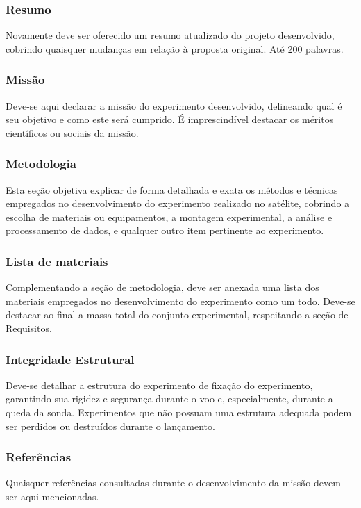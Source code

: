         \subsubsection{Resumo}
            Novamente deve ser oferecido um resumo atualizado do projeto desenvolvido, cobrindo quaisquer mudanças em relação à proposta original. Até 200 palavras.

        \subsubsection{Missão}
            Deve-se aqui declarar a missão do experimento desenvolvido, delineando qual é seu objetivo e como este será cumprido. É imprescindível destacar os méritos científicos ou sociais da missão.
        
        \subsubsection{Metodologia}
            Esta seção objetiva explicar de forma detalhada e exata os métodos e técnicas empregados no desenvolvimento do experimento realizado no satélite, cobrindo a escolha de materiais ou equipamentos, a montagem experimental, a análise e processamento de dados, e qualquer outro item pertinente ao experimento.

        \subsubsection{Lista de materiais}
            Complementando a seção de metodologia, deve ser anexada uma lista dos materiais empregados no desenvolvimento do experimento como um todo. Deve-se destacar ao final a massa total do conjunto experimental, respeitando a seção de Requisitos.

        \subsubsection{Integridade Estrutural}
            Deve-se detalhar a estrutura do experimento de fixação do experimento, garantindo sua rigidez e segurança durante o voo e, especialmente, durante a queda da sonda. Experimentos que não possuam uma estrutura adequada podem ser perdidos ou destruídos durante o lançamento.

        \subsubsection{Referências}
            Quaisquer referências consultadas durante o desenvolvimento da missão devem ser aqui mencionadas.

